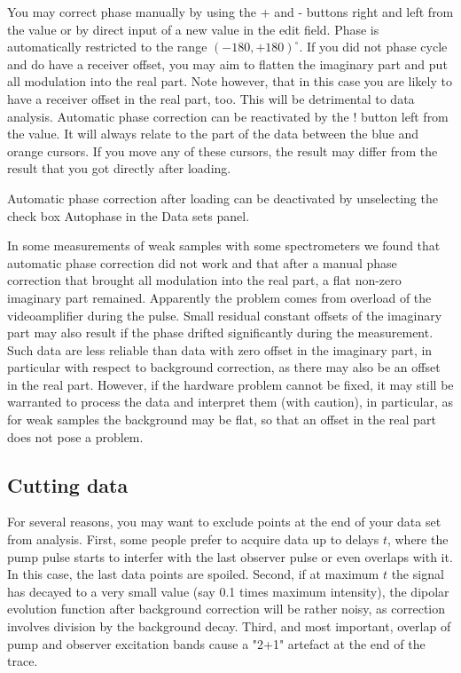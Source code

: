 \documentclass{article}
\begin{document}
You may correct phase manually by using the {\ttfamily +} and {\ttfamily -} buttons right and left from the value or by direct input of a new value in the edit field. Phase is automatically restricted to the range $(-180,+180)^\circ$. If you did not phase cycle
and do have a receiver offset, you may aim to flatten the imaginary part and
put all modulation into the real part. Note however, that in this case you are
likely to have a receiver offset in the real part, too. This will be detrimental to
data analysis. Automatic phase correction can be reactivated by the {\ttfamily !} button left from the value. It will always relate to the part of the data between the blue and orange cursors. If you move any of these cursors, the result may differ from the result that you got directly after loading.

Automatic phase correction after loading can be deactivated by unselecting
the check box {\ttfamily Autophase} in the {\ttfamily Data sets} panel.

In some measurements of weak samples with some spectrometers we found that automatic phase correction did not work and that after a manual phase correction that brought all modulation into the real part, a flat non-zero imaginary part remained. Apparently the problem comes from overload of the videoamplifier during the pulse. Small residual constant offsets of the imaginary part may also result if the phase drifted significantly during the measurement. Such data are less reliable than data with zero offset in the imaginary part, in particular with respect to background correction, as there may also be an offset in the real part. However, if the hardware problem cannot be fixed, it may still be warranted to process the data and interpret them (with caution), in particular, as for weak samples the background may be flat, so that an offset in the real part does not pose a problem.

\subsection{Cutting data}
For several reasons, you may want to exclude points at the end of
your data set from analysis. First, some people prefer to acquire data up to
delays $t$, where the pump pulse starts to interfer with the last observer pulse
or even overlaps with it. In this case, the last data points are spoiled. Second,
if at maximum $t$ the signal has decayed to a very small value (say 0.1 times
maximum intensity), the dipolar evolution function after background correction
will be rather noisy, as correction involves division by the background decay.
Third, and most important, overlap of pump and observer excitation bands cause a "2+1" artefact at the end of the trace.
\end{document}
